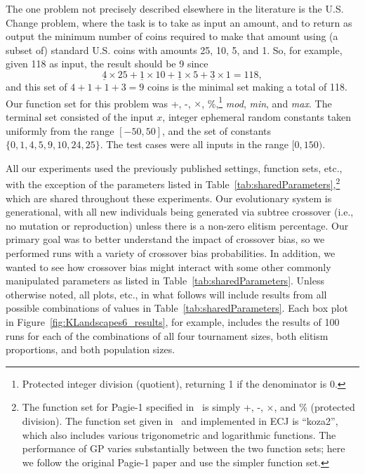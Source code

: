 \documentclass{sig-alternate}
\begin{document}
The one problem not precisely described elsewhere in the literature is the U.S. Change problem, 
where the task is to take as input an amount, and to return as output the minimum 
number of coins required to make that amount using (a subset of) standard U.S. coins with amounts 
25, 10, 5, and 1. So, for example, given 118 as input, the result should be 9 since 
\[
	\underline{4} \times 25 + \underline{1} \times 10 + \underline{1} \times 5 + \underline{3} \times 1 = 118,
\]
and this set of $4+1+1+3 = 9$ coins is the minimal set 
making a total of 118. Our function set for this problem was +, -, $\times$, \%,\footnote{Protected integer 
division (quotient), returning 1 if the denominator is 0.} \emph{mod}, \emph{min}, and \emph{max}. 
The terminal set consisted of the input $x$, integer ephemeral random constants taken uniformly 
from the range $[-50, 50]$, and the set of constants $\{ 0, 1, 4, 5, 9, 10, 24, 25 \}$. The test cases 
were all inputs in the range $[0, 150)$.


All our experiments used the previously published
settings, function sets, etc., with the exception of the parameters listed in 
Table~\ref{tab:sharedParameters},\footnote{The function 
set for Pagie-1 specified in~\cite{pagie1997evolutionary} is simply +, -, $\times$, and \% (protected division). 
The function set given in~\cite{mcdermott2012genetic} and implemented in ECJ is ``koza2'', which 
also includes various trigonometric and logarithmic functions. The performance of GP varies 
substantially between the two function sets; here we follow the original Pagie-1 paper and use the 
simpler function set.}
which are shared throughout these experiments. Our evolutionary system is 
generational, with all new individuals being generated via subtree crossover (i.e., no mutation or reproduction) 
unless there is a non-zero elitism percentage. Our primary goal was to better understand the 
impact of crossover bias, so we performed runs with a variety of crossover bias probabilities. In addition,  we
wanted to see how crossover bias might interact with some other commonly manipulated parameters 
as listed in Table~\ref{tab:sharedParameters}. Unless otherwise noted, all plots, etc., in what follows will include results from 
all possible combinations of values in Table~\ref{tab:sharedParameters}. Each box plot in 
Figure~\ref{fig:KLandscapes6_results}, for example, includes the results of 100 runs for each of the 
combinations of all four 
tournament sizes, both elitism proportions, and both population sizes.
\end{document}
